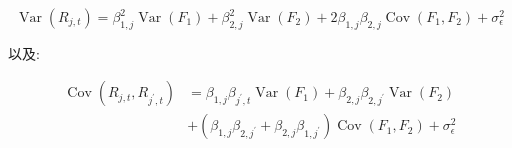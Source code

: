 \documentclass[letterpaper]{article}
\begin{document}
$$
\operatorname{Var}\left(R_{j, t}\right)=\beta_{1, j}^{2} \operatorname{Var}\left(F_{1}\right)+\beta_{2, j}^{2} \operatorname{Var}\left(F_{2}\right)+2 \beta_{1, j} \beta_{2, j} \operatorname{Cov}\left(F_{1}, F_{2}\right)+\sigma_{\epsilon}^{2}
$$

以及:

$$
\begin{aligned}
\operatorname{Cov}\left(R_{j, t}, R_{j^{\prime}, t}\right) & =\beta_{1, j} \beta_{j^{\prime}, t} \operatorname{Var}\left(F_{1}\right)+\beta_{2, j} \beta_{2, j^{\prime}} \operatorname{Var}\left(F_{2}\right) \\
& +\left(\beta_{1, j} \beta_{2, j^{\prime}}+\beta_{2, j} \beta_{1, j^{\prime}}\right) \operatorname{Cov}\left(F_{1}, F_{2}\right)+\sigma_{\epsilon}^{2}
\end{aligned}
$$
\end{document}
